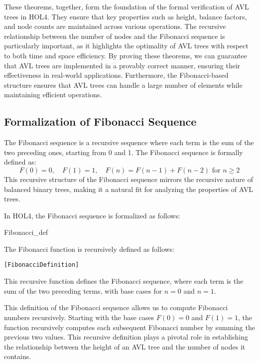 These theorems, together, form the foundation of the formal verification of AVL trees in HOL4. They ensure that key properties such as height, balance factors, and node counts are maintained across various operations. The recursive relationship between the number of nodes and the Fibonacci sequence is particularly important, as it highlights the optimality of AVL trees with respect to both time and space efficiency. By proving these theorems, we can guarantee that AVL trees are implemented in a provably correct manner, ensuring their effectiveness in real-world applications. Furthermore, the Fibonacci-based structure ensures that AVL trees can handle a large number of elements while maintaining efficient operations.

\subsection{Formalization of Fibonacci Sequence}

    The Fibonacci sequence is a recursive sequence where each term is the sum of the two preceding ones, starting from 0 and 1. The Fibonacci sequence is formally defined as:
    \[
    F(0) = 0, \quad F(1) = 1, \quad F(n) = F(n-1) + F(n-2) \text{ for } n \geq 2
    \]
    This recursive structure of the Fibonacci sequence mirrors the recursive nature of balanced binary trees, making it a natural fit for analyzing the properties of AVL trees.

    In HOL4, the Fibonacci sequence is formalized as follows:
   \begin{defn}{Fibonacci\_def}

    The Fibonacci function is recursively defined as follows:

     \begin{alltt}
[Fibonacci Definition]
     \end{alltt}
     

    This recursive function defines the Fibonacci sequence, where each term is the sum of the two preceding terms, with base cases for \( n = 0 \) and \( n = 1 \).
    \end{defn}


    This definition of the Fibonacci sequence allows us to compute Fibonacci numbers recursively. Starting with the base cases \( F(0) = 0 \) and \( F(1) = 1 \), the function recursively computes each subsequent Fibonacci number by summing the previous two values. This recursive definition plays a pivotal role in establishing the relationship between the height of an AVL tree and the number of nodes it contains.


